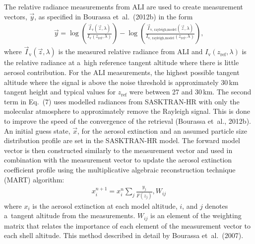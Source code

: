 \documentclass[amt]{copernicus}
\begin{document}
The relative radiance measurements from ALI are used to create measurement
vectors, $\vec{y}$, as specified in Bourassa et~al.~(2012b) in the form
\begin{align}
  \vec{y}=\log
  \left(\frac{\vec{I}_{\mathrm{v}}\left(\vec{z},\lambda
      \right)}{I_{\mathrm{v}}\left(z_{\mathrm{ref}},\lambda \right)}
  \right)-\log {\left(\frac{\vec{I}_{\text{v,
            rayleigh,model}}\left(\vec{z},\lambda \right)}{I_{\text{v,
            rayleigh,model}}\left(z_{\mathrm{ref}},\lambda \right)}
    \right)},
\end{align}
where $\vec{I}_{\mathrm{v}}\left(\vec{z},\lambda \right)$ is the measured
relative radiance from ALI and $I_{\mathrm{v}}\left(z_{\mathrm{ref}},\lambda
\right)$ is the relative radiance at a~high reference tangent altitude where
there is little aerosol contribution. For the ALI measurements, the highest
possible tangent altitude where the signal is above the noise threshold is
approximately 30\,\unit{km} tangent height and typical values for $z_\text{ref}$ were between 27 and 30\,\unit{km}. The second term in Eq.~(7) uses
modelled radiances from SASKTRAN-HR with only the molecular atmosphere to
approximately remove the Rayleigh signal. This is done to improve the speed
of the convergence of the retrieval (Bourassa et~al., 2012b). An initial
guess state, $\vec{x}$, for the aerosol extinction and an assumed particle
size distribution profile are set in the SASKTRAN-HR model. The forward model
vector is then constructed similarly to the measurement vector and used in
combination with the measurement vector to update the aerosol extinction
coefficient profile using the multiplicative algebraic reconstruction technique
(MART) algorithm:
\begin{align}
x_{{i}}^{n+1}=x_{{i}}^{n}\sum\limits_j \frac{y_{j}}{F\left(z_{j} \right)},
W_{{ij}}
\end{align}
where $x_{{i}}$ is the aerosol extinction at each model altitude, $i$, and $j$
denotes a~tangent altitude from the measurements. $W_{{ij}}$ is an element of
the weighting matrix that relates the importance of each element of the
measurement vector to each shell altitude. This method described in detail by
Bourassa et~al.~(2007).
\end{document}
